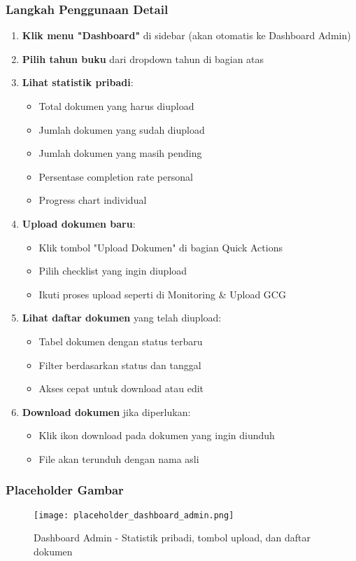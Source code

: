 \documentclass[12pt,a4paper]{article}
\begin{document}
\subsubsection{Langkah Penggunaan Detail}
\begin{enumerate}
\item \textbf{Klik menu "Dashboard"} di sidebar (akan otomatis ke Dashboard Admin)
\item \textbf{Pilih tahun buku} dari dropdown tahun di bagian atas
\item \textbf{Lihat statistik pribadi}:
\begin{itemize}
\item Total dokumen yang harus diupload
\item Jumlah dokumen yang sudah diupload
\item Jumlah dokumen yang masih pending
\item Persentase completion rate personal
\item Progress chart individual
\end{itemize}
\item \textbf{Upload dokumen baru}:
\begin{itemize}
\item Klik tombol "Upload Dokumen" di bagian Quick Actions
\item Pilih checklist yang ingin diupload
\item Ikuti proses upload seperti di Monitoring \& Upload GCG
\end{itemize}
\item \textbf{Lihat daftar dokumen} yang telah diupload:
\begin{itemize}
\item Tabel dokumen dengan status terbaru
\item Filter berdasarkan status dan tanggal
\item Akses cepat untuk download atau edit
\end{itemize}
\item \textbf{Download dokumen} jika diperlukan:
\begin{itemize}
\item Klik ikon download pada dokumen yang ingin diunduh
\item File akan terunduh dengan nama asli
\end{itemize}
\end{enumerate}

\subsubsection{Placeholder Gambar}
\begin{figure}[H]
\centering
\texttt{[image: placeholder\_dashboard\_admin.png]}
\caption{Dashboard Admin - Statistik pribadi, tombol upload, dan daftar dokumen}
\label{fig:dashboard_admin}
\end{figure}
\end{document}
